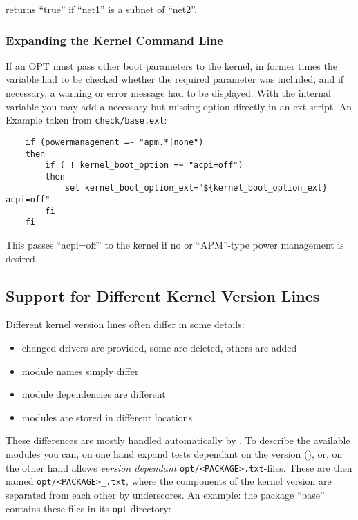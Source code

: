 returns ``true'' if ``net1'' is a subnet of ``net2''.

\subsubsection{Expanding the Kernel Command Line}

If an OPT must pass other boot parameters to the kernel, in former times
the variable  had to be checked whether the required
parameter was included, and if necessary, a warning or error message had to be
displayed. With the internal variable 
you may add a necessary but missing option directly in an ext-script. An
Example taken from \texttt{check/base.ext}:

\begin{example}
\begin{verbatim}
    if (powermanagement =~ "apm.*|none")
    then
        if ( ! kernel_boot_option =~ "acpi=off")
        then
            set kernel_boot_option_ext="${kernel_boot_option_ext} acpi=off"
        fi
    fi
\end{verbatim}
\end{example}

This passes ``acpi=off'' to the kernel if no or ``APM''-type power
management is desired.

\subsection{Support for Different Kernel Version Lines}

Different kernel version lines often differ in some details:
\begin{itemize}
\item changed drivers are provided, some are deleted, others are added
\item module names simply differ
\item module dependencies are different
\item modules are stored in different locations
\end{itemize}

These differences are mostly handled automatically by .
To describe the available modules you can, on one hand expand tests
dependant on the version
(), or,
on the other hand  allows \emph{version dependant}
\texttt{opt/<PACKAGE>.txt}-files. These are then named
\texttt{opt/<PACKAGE>\_<Kernel-Version>.txt}, where the components of the
kernel version are separated from each other by underscores. An example:
the package ``base'' contains these files in its \texttt{opt}-directory:

